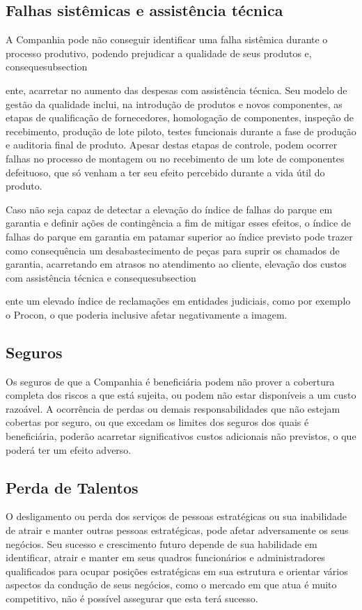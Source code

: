 {\subsection{Falhas sistêmicas e assistência técnica} 
A Companhia pode não conseguir identificar uma falha sistêmica durante o processo produtivo, podendo prejudicar a qualidade de seus produtos e, consequesubsection{ente, acarretar no aumento das despesas com assistência técnica. Seu modelo de gestão da qualidade inclui, na introdução de produtos e novos componentes, as etapas de qualificação de fornecedores, homologação de componentes, inspeção de recebimento, produção de lote piloto, testes funcionais durante a fase de produção e auditoria final de produto. Apesar destas etapas de controle, podem ocorrer falhas no processo de montagem ou no recebimento de um lote de componentes defeituoso, que só venham a ter seu efeito percebido durante a vida útil do produto. 

Caso não seja capaz de detectar a elevação do índice de falhas do parque em garantia e definir ações de contingência a fim de mitigar esses efeitos, o índice de falhas do parque em garantia em patamar superior ao índice previsto pode trazer como consequência um desabastecimento de peças para suprir os chamados de garantia, acarretando em atrasos no atendimento ao cliente, elevação dos custos com assistência técnica e consequesubsection{ente um elevado índice de reclamações em entidades judiciais, como por exemplo o Procon, o que poderia inclusive afetar negativamente a imagem.

\subsection{Seguros} 
Os seguros de que a Companhia é beneficiária podem não prover a cobertura completa dos riscos a que está sujeita, ou podem não estar disponíveis a um custo razoável. A ocorrência de perdas ou demais responsabilidades que não estejam cobertas por seguro, ou que excedam os limites dos seguros dos quais é beneficiária, poderão acarretar significativos custos adicionais não previstos, o que poderá ter um efeito adverso.

\subsection{Perda de Talentos}
O desligamento ou perda dos serviços de pessoas estratégicas ou sua inabilidade de atrair e manter outras pessoas estratégicas, pode afetar adversamente os seus negócios. Seu sucesso e crescimento futuro depende de sua habilidade em identificar, atrair e manter em seus quadros funcionários e administradores qualificados para ocupar posições estratégicas em sua estrutura e orientar vários aspectos da condução de seus negócios, como o mercado em que atua é muito competitivo, não é possível assegurar que esta terá sucesso.

}}}
